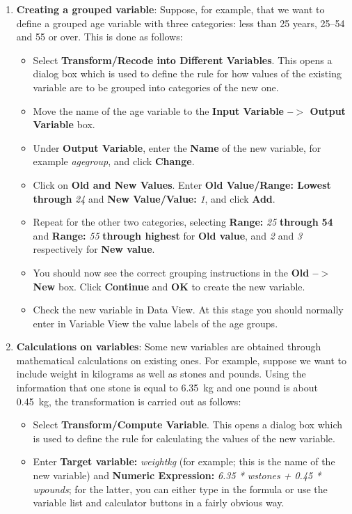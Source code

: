 \begin{enumerate}
\begin{enumerate}
\item
\textbf{Creating a grouped variable}:
Suppose, for example, that we want to define a grouped age variable
with three categories: less than 25 years, 25--54 and 55 or over. This is done
as follows:
\begin{itemize}
\item
Select \textbf{Transform/Recode into Different
Variables}. This opens a dialog box which is used to define the rule for
how values of the existing variable are to be grouped
into categories of the new one.
\item
Move the name of the age
variable to the \textbf{Input Variable --$>$ Output Variable} box.
\item
Under \textbf{Output Variable}, enter
the \textbf{Name} of the new variable, for example
\emph{agegroup}, and click \textbf{Change}.
\item
Click on \textbf{Old and New Values}. Enter \textbf{Old Value/Range:
Lowest through} \emph{24} and \textbf{New Value/Value:} \emph{1}, and
click \textbf{Add}.
\item
Repeat for the other two categories, selecting
\textbf{Range:} \emph{25} \textbf{through} \textbf{54} and
\textbf{Range:} \emph{55} \textbf{through highest}
for \textbf{Old value}, and \emph{2} and \emph{3} respectively
for \textbf{New value}.
\item
You should now see the correct grouping instructions in the \textbf{Old
--$\mathbf{>}$ New} box. Click \textbf{Continue} and \textbf{OK} to
create the new variable.
\item
Check the new variable in Data View. At this stage
you should normally enter in Variable View the value labels of the age
groups.
\end{itemize}
\item
\textbf{Calculations on variables}: Some new variables are obtained
through mathematical calculations on existing ones. For example, suppose
we want to include weight in kilograms as well as stones and pounds.
Using the information that one stone is equal to 6.35~kg and one pound
is about 0.45~kg, the transformation is carried out as follows:
\begin{itemize}
\item
Select \textbf{Transform/Compute Variable}. This opens a dialog box which is
used to define the rule for calculating the values of the new variable.
\item
Enter \textbf{Target variable:} \emph{weightkg} (for example; this is
the name of the new variable) and
\textbf{Numeric Expression:} \emph{6.35 * wstones + 0.45 * wpounds}; for
the latter, you can either type in the formula or use the variable list and
calculator buttons in a fairly obvious way.
\end{itemize}
\end{enumerate}
\end{enumerate}


